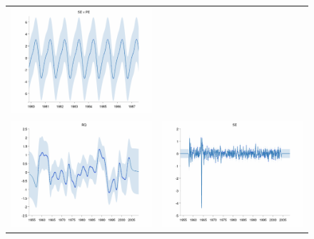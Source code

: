 \documentclass[twoside]{article}
\begin{document}
\begin{figure}[h!]
\begin{minipage}{\columnwidth}
\begin{tabular}{cc}
 \includegraphics[width=\fwmauna]{../figures/decomposition/mauna_test_2} \\
 \includegraphics[width=\fwmauna]{../figures/decomposition/mauna_test_3} & 
 \includegraphics[width=\fwmauna]{../figures/decomposition/mauna_test_4} 

\end{tabular}
\end{minipage}
\end{figure}
\end{document}
